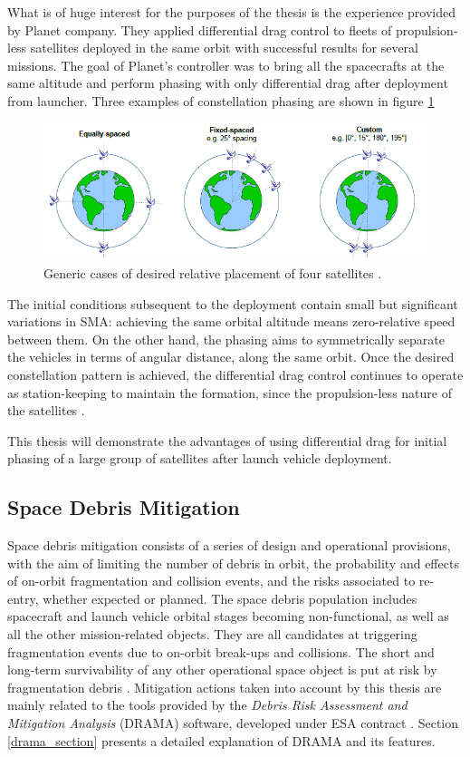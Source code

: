 What is of huge interest for the purposes of the thesis is the experience provided by Planet company.
They applied differential drag control to fleets of propulsion-less satellites deployed in the same orbit with successful results for several missions.
The goal of Planet's controller was to bring all the spacecrafts at the same altitude and perform phasing with only differential drag after deployment from launcher.
Three examples of constellation phasing are shown in figure \ref{phasing_examples_figure}
\begin{figure}[h]
    \centering
    \includegraphics[scale=1]{img/phasing_examples.png}
    \caption{Generic cases of desired relative placement of four satellites \cite{foster2018differential}.}
    \label{phasing_examples_figure}
\end{figure}
The initial conditions subsequent to the deployment contain small but significant variations in SMA: achieving the same orbital altitude means zero-relative speed between them.
On the other hand, the phasing aims to symmetrically separate the vehicles in terms of angular distance, along the same orbit. 
Once the desired constellation pattern is achieved, the differential drag control continues to operate as station-keeping to maintain the formation, since the propulsion-less nature of the satellites \cite{foster2018differential}.

This thesis will demonstrate the advantages of using differential drag for initial phasing of a large group of satellites after launch vehicle deployment. 


\subsection{Space Debris Mitigation} \label{space_debris_mitigation}
Space debris mitigation consists of a series of design and operational provisions, with the aim of limiting the number of debris in orbit, the probability and effects of on-orbit fragmentation and collision events, and the risks associated to re-entry, whether expected or planned.
The space debris population includes spacecraft and launch vehicle orbital stages becoming non-functional, as well as all the other mission-related objects.
They are all candidates at triggering fragmentation events due to on-orbit break-ups and collisions.
The short and long-term survivability of any other operational space object is put at risk by fragmentation debris \cite{esa2023debrisguidelines}.
Mitigation actions taken into account by this thesis are mainly related to the tools provided by the \textit{Debris Risk Assessment and Mitigation Analysis} (DRAMA) software, developed under ESA contract \cite{braun2013drama}.
Section \ref{drama_section} presents a detailed explanation of DRAMA and its features. 


